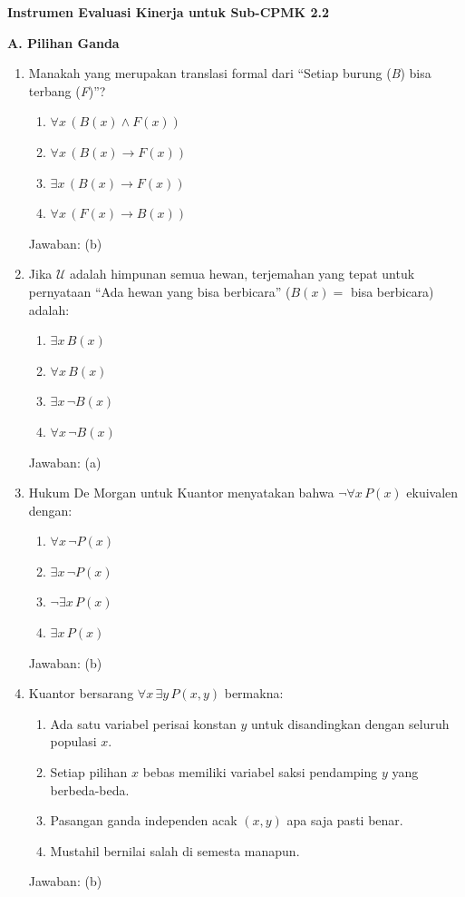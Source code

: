 \documentclass[../main]{subfiles}
\begin{document}
\begin{asesmen}
\textbf{Instrumen Evaluasi Kinerja untuk Sub-CPMK 2.2}

\textbf{A. Pilihan Ganda}
\begin{enumerate}
  \item Manakah yang merupakan translasi formal dari ``Setiap burung (\textit{B}) bisa terbang (\textit{F})''?
  \begin{enumerate}
    \item $\forall x \, (B(x) \land F(x))$
    \item $\forall x \, (B(x) \rightarrow F(x))$
    \item $\exists x \, (B(x) \rightarrow F(x))$
    \item $\forall x \, (F(x) \rightarrow B(x))$
  \end{enumerate}
  Jawaban: (b)

  \item Jika $\mathcal{U}$ adalah himpunan semua hewan, terjemahan yang tepat untuk pernyataan ``Ada hewan yang bisa berbicara'' ($B(x) =$ bisa berbicara) adalah:
  \begin{enumerate}
    \item $\exists x \, B(x)$
    \item $\forall x \, B(x)$
    \item $\exists x \, \neg B(x)$
    \item $\forall x \, \neg B(x)$
  \end{enumerate}
  Jawaban: (a)

  \item Hukum De Morgan untuk Kuantor menyatakan bahwa $\neg \forall x \, P(x)$ ekuivalen dengan:
  \begin{enumerate}
    \item $\forall x \, \neg P(x)$
    \item $\exists x \, \neg P(x)$
    \item $\neg \exists x \, P(x)$
    \item $\exists x \, P(x)$
  \end{enumerate}
  Jawaban: (b)

  \item Kuantor bersarang $\forall x \, \exists y \, P(x,y)$ bermakna:
  \begin{enumerate}
    \item Ada satu variabel perisai konstan $y$ untuk disandingkan dengan seluruh populasi $x$.
    \item Setiap pilihan $x$ bebas memiliki variabel saksi pendamping $y$ yang berbeda-beda.
    \item Pasangan ganda independen acak $(x,y)$ apa saja pasti benar.
    \item Mustahil bernilai salah di semesta manapun.
  \end{enumerate}
  Jawaban: (b)
\end{enumerate}


\end{asesmen}
\end{document}
